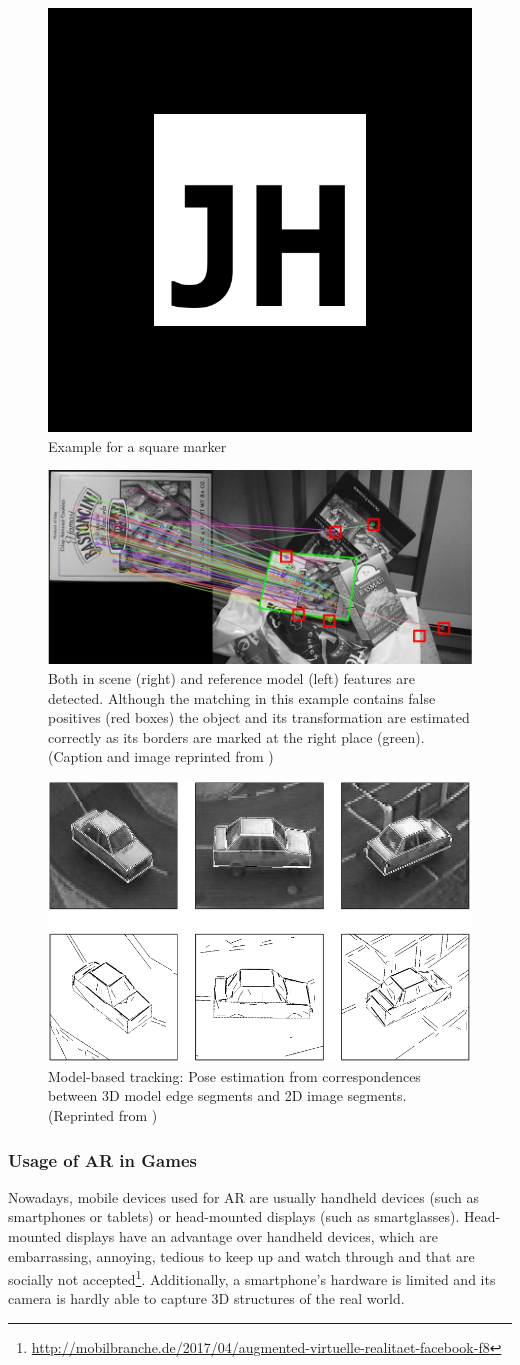 \begin{figure}[bth]
  \centering
        \includegraphics[width=.2\linewidth]{gfx/jh_marker}
        \caption{Example for a square marker}
        \label{fig:marker}
\end{figure}
\begin{figure}[bth]
  \centering
        \includegraphics[width=.45\linewidth]{gfx/nft_tracking_reprint}
        \caption{Both in scene (right) and reference model (left) features are detected. Although the matching in this
example contains false positives (red boxes) the object and its transformation are estimated correctly
as its borders are marked at the right place (green). (Caption and image reprinted from \citep{hock2014augmented})}
        \label{fig:nft-tracking}
\end{figure}
\begin{figure}[bth]
  \centering
        \includegraphics[width=.45\linewidth]{gfx/model_based_tracking_reprint}
        \caption{Model-based tracking: Pose estimation from correspondences between 3D model edge segments and 2D image segments. (Reprinted from \citep{lepetit2005monocular})}
        \label{fig:model-based-tracking}
\end{figure}

\subsubsection{Usage of AR in Games}\label{sec:usageOfARStateOfTheArt}
Nowadays, mobile devices used for AR are usually handheld devices (such as smartphones or tablets) or head-mounted displays (such as smartglasses). Head-mounted displays have an advantage over handheld devices, which are embarrassing, annoying, tedious to keep up and watch through and that are socially not accepted\footnote{\url{http://mobilbranche.de/2017/04/augmented-virtuelle-realitaet-facebook-f8}}. Additionally, a smartphone's hardware is limited and its camera is hardly able to capture 3D structures of the real world.

